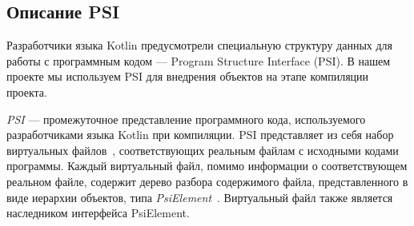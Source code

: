 \subsection{Описание PSI}
\label{sub:psi_description}
Разработчики языка Kotlin предусмотрели специальную структуру данных для работы
с программным кодом --- Program Structure Interface (PSI).
В нашем проекте мы используем PSI для внедрения объектов на этапе компиляции
проекта.

\textit{PSI} --- промежуточное представление программного кода, используемого
разработчиками языка Kotlin при компиляции.
PSI представляет из себя набор виртуальных файлов~\cite{psi_file},
соответствующих реальным файлам с исходными кодами программы.
Каждый виртуальный файл, помимо информации о соответствующем реальном файле,
содержит дерево разбора содержимого файла, представленного в виде иерархии
объектов, типа \textit{PsiElement}~\cite{psi_element}.
Виртуальный файл также является наследником интерфейса PsiElement.
